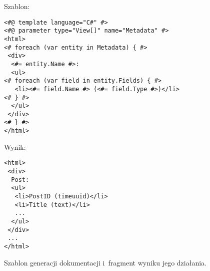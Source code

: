 \begin{figure}[!ht]
Szablon:

\begin{verbatim}
<#@ template language="C#" #>
<#@ parameter type="View[]" name="Metadata" #>
<html>
<# foreach (var entity in Metadata) { #>
 <div>
  <#= entity.Name #>:
  <ul>
<# foreach (var field in entity.Fields) { #>
   <li><#= field.Name #> (<#= field.Type #>)</li>
<# } #>
  </ul>
 </div>
<# } #>
</html>
\end{verbatim}

Wynik:

\begin{verbatim}
<html>
 <div>
  Post:
  <ul>
   <li>PostID (timeuuid)</li>
   <li>Title (text)</li>
   ...
  </ul>
 </div>
 ...
</html>
\end{verbatim}

\caption{Szablon generacji dokumentacji i~fragment wyniku jego działania.}
\label{fig:single:template_docs}
\end{figure}
